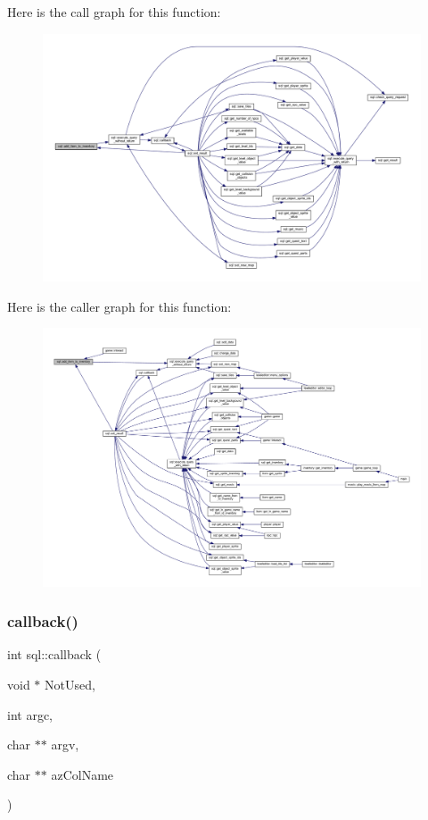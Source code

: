 Here is the call graph for this function\+:
\nopagebreak
\begin{figure}[H]
\begin{center}
\leavevmode
\includegraphics[width=350pt]{classsql_af0e753f3af81ff1ff7f7582dcea4b0ed_cgraph}
\end{center}
\end{figure}
Here is the caller graph for this function\+:
\nopagebreak
\begin{figure}[H]
\begin{center}
\leavevmode
\includegraphics[width=350pt]{classsql_af0e753f3af81ff1ff7f7582dcea4b0ed_icgraph}
\end{center}
\end{figure}
\mbox{\label{classsql_aff61710f28dd54827b67a99c24fbdb0d}} 
\subsubsection{\texorpdfstring{callback()}{callback()}}
{\footnotesize\ttfamily int sql\+::callback (\begin{DoxyParamCaption}\item[{void $\ast$}]{Not\+Used,  }\item[{int}]{argc,  }\item[{char $\ast$$\ast$}]{argv,  }\item[{char $\ast$$\ast$}]{az\+Col\+Name }\end{DoxyParamCaption})\hspace{0.3cm}{\ttfamily [static]}}



